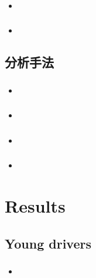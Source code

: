 \documentclass[dvipdfmx, 12pt]{beamer}
\begin{document}
\begin{frame}\frametitle{}
	\begin{itemize}
	\item 
	\end{itemize}
\end{frame}

\begin{frame}\frametitle{}
	\begin{itemize}
	\item 
	\end{itemize}
\end{frame}

\subsection{分析手法}
\begin{frame}\frametitle{}
	\begin{itemize}
	\item 
	\end{itemize}
\end{frame}

\begin{frame}\frametitle{}
	\begin{itemize}
	\item 
	\end{itemize}
\end{frame}

\begin{frame}\frametitle{}
	\begin{itemize}
	\item 
	\end{itemize}
\end{frame}

\begin{frame}\frametitle{}
	\begin{itemize}
	\item 
	\end{itemize}
\end{frame}


\section{Results}
\subsection{Young drivers}
\begin{frame}\frametitle{}
	\begin{itemize}
	\item 
	\end{itemize}
\end{frame}
\end{document}
